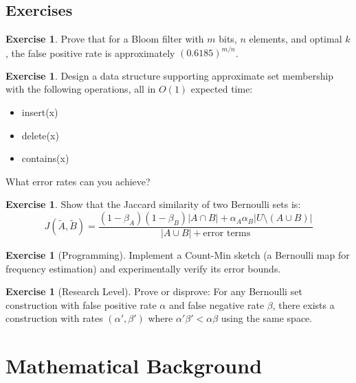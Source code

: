 \documentclass[11pt,twoside,openright]{book}
\theoremstyle{definition}
\newtheorem{exercise}[definition]{Exercise}
\theoremstyle{plain}
\theoremstyle{remark}
\begin{document}
\section{Exercises}

\begin{exercise}
Prove that for a Bloom filter with $m$ bits, $n$ elements, and optimal $k$, the false positive rate is approximately $(0.6185)^{m/n}$.
\end{exercise}

\begin{exercise}
Design a data structure supporting approximate set membership with the following operations, all in $O(1)$ expected time:
\begin{itemize}
    \item insert(x)
    \item delete(x)
    \item contains(x)
\end{itemize}
What error rates can you achieve?
\end{exercise}

\begin{exercise}
Show that the Jaccard similarity of two Bernoulli sets is:
\begin{equation}
J(\tilde{A}, \tilde{B}) = \frac{(1-\beta_A)(1-\beta_B)|A \cap B| + \alpha_A\alpha_B|U \setminus (A \cup B)|}{|A \cup B| + \text{error terms}}
\end{equation}
\end{exercise}

\begin{exercise}[Programming]
Implement a Count-Min sketch (a Bernoulli map for frequency estimation) and experimentally verify its error bounds.
\end{exercise}

\begin{exercise}[Research Level]
Prove or disprove: For any Bernoulli set construction with false positive rate $\alpha$ and false negative rate $\beta$, there exists a construction with rates $(\alpha', \beta')$ where $\alpha' \beta' < \alpha \beta$ using the same space.
\end{exercise}


\appendix

\chapter{Mathematical Background}
\end{document}
